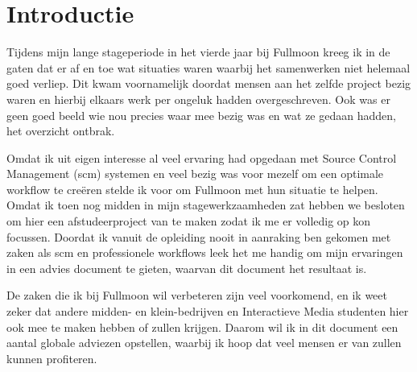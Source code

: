\setcounter{chapter}{0}
\chapter{Introductie}
  
Tijdens mijn lange stageperiode in het vierde jaar bij Fullmoon kreeg ik in de gaten dat er af en toe wat situaties waren waarbij het samenwerken niet helemaal goed verliep. Dit kwam voornamelijk doordat mensen aan het zelfde project bezig waren en hierbij elkaars werk per ongeluk hadden overgeschreven. Ook was er geen goed beeld wie nou precies waar mee bezig was en wat ze gedaan hadden, het overzicht ontbrak.
  
Omdat ik uit eigen interesse al veel ervaring had opgedaan met Source Control Management ({\sc scm}) systemen en veel bezig was voor mezelf om een optimale workflow te cre\"{e}ren stelde ik voor om Fullmoon met hun situatie te helpen. Omdat ik toen nog midden in mijn stagewerkzaamheden zat hebben we besloten om hier een afstudeerproject van te maken zodat ik me er volledig op kon focussen. Doordat ik vanuit de opleiding nooit in aanraking ben gekomen met zaken als {\sc scm} en professionele workflows leek het me handig om mijn ervaringen in een advies document te gieten, waarvan dit document het resultaat is.
  
De zaken die ik bij Fullmoon wil verbeteren zijn veel voorkomend, en ik weet zeker dat andere midden- en klein-bedrijven en Interactieve Media studenten hier ook mee te maken hebben of zullen krijgen. Daarom wil ik in dit document een aantal globale adviezen opstellen, waarbij ik hoop dat veel mensen er van zullen kunnen profiteren.
  
